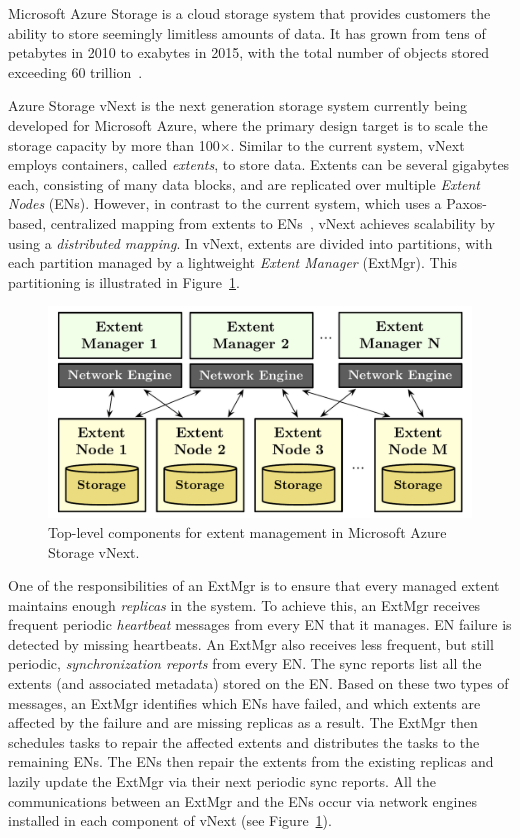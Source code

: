 Microsoft Azure Storage is a cloud storage system that provides customers the ability to store seemingly limitless amounts of data. It has grown from tens of petabytes in 2010 to exabytes in 2015, with the total number of objects stored exceeding 60 trillion~\cite{greenberg2015keynote}.

Azure Storage vNext is the next generation storage system currently being developed for Microsoft Azure, where the primary design target is to scale the storage capacity by more than 100$\times$. Similar to the current system, vNext employs containers, called \emph{extents}, to store data. Extents can be several gigabytes each, consisting of many data blocks, and are replicated over multiple \emph{Extent Nodes} (ENs). However, in contrast to the current system, which uses a Paxos-based, centralized mapping from extents to ENs~\cite{calder2011windows}, vNext achieves scalability by using a \emph{distributed mapping}. In vNext, extents are divided into partitions, with each partition managed by a lightweight \emph{Extent Manager} (ExtMgr). This partitioning is illustrated in Figure~\ref{fig:vnext}.

\begin{figure}[t]
\centering
\includegraphics[width=\linewidth]{img/azurestore}
\vspace{-6mm}
\caption{Top-level components for extent management in Microsoft Azure Storage vNext.}
\label{fig:vnext}
\vspace{-2mm}
\end{figure}

One of the responsibilities of an ExtMgr is to ensure that every managed extent maintains enough \emph{replicas} in the system. To achieve this, an ExtMgr receives frequent periodic \emph{heartbeat} messages from every EN that it manages. EN failure is detected by missing heartbeats. An ExtMgr also receives less frequent, but still periodic, \emph{synchronization reports} from every EN. The sync reports list all the extents (and associated metadata) stored on the EN. Based on these two types of messages, an ExtMgr identifies which ENs have failed, and which extents are affected by the failure and are missing replicas as a result. The ExtMgr then schedules tasks to repair the affected extents and distributes the tasks to the remaining ENs. The ENs then repair the extents from the existing replicas and lazily update the ExtMgr via their next periodic sync reports. All the communications between an ExtMgr and the ENs occur via network engines installed in each component of vNext (see Figure~\ref{fig:vnext}).


